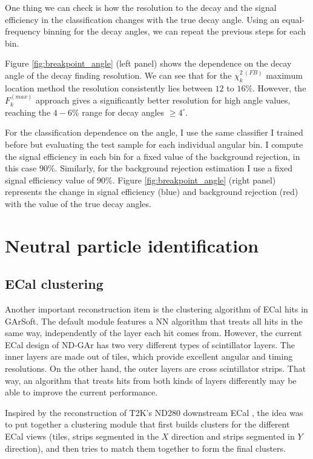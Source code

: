 One thing we can check is how the resolution to the decay and the signal efficiency in the classification changes with the true decay angle. Using an equal-frequency binning for the decay angles, we can repeat the previous steps for each bin.

Figure \ref{fig:breakpoint_angle} (left panel) shows the dependence on the decay angle of the decay finding resolution. We can see that for the $\chi_{k}^{2 \ (FB)}$ maximum location method the resolution consistently lies between $12$ to $16\%$. However, the $F^{(max)}_{k}$ approach gives a significantly better resolution for high angle values, reaching the $4-6\%$ range for decay angles $\geq 4^{\circ}$.

For the classification dependence on the angle, I use the same classifier I trained before but evaluating the test sample for each individual angular bin. I compute the signal efficiency in each bin for a fixed value of the background rejection, in this case $90\%$. Similarly, for the background rejection estimation I use a fixed signal efficiency value of $90\%$. Figure \ref{fig:breakpoint_angle} (right panel) represents the change in signal efficiency (blue) and background rejection (red) with the value of the true decay angles.

\section{Neutral particle identification}

\subsection{ECal clustering}

Another important reconstruction item is the clustering algorithm of ECal hits in GArSoft. The default module features a NN algorithm that treats all hits in the same way, independently of the layer each hit comes from. However, the current ECal design of ND-GAr has two very different types of scintillator layers. The inner layers are made out of tiles, which provide excellent angular and timing resolutions. On the other hand, the outer layers are cross scintillator strips. That way, an algorithm that treats hits from both kinds of layers differently may be able to improve the current performance.

Inspired by the reconstruction of T2K's ND280 downstream ECal \cite{T2KUK2013}, the idea was to put together a clustering module that first builds clusters for the different ECal views (tiles, strips segmented in the $X$ direction and strips segmented in $Y$ direction), and then tries to match them together to form the final clusters.

